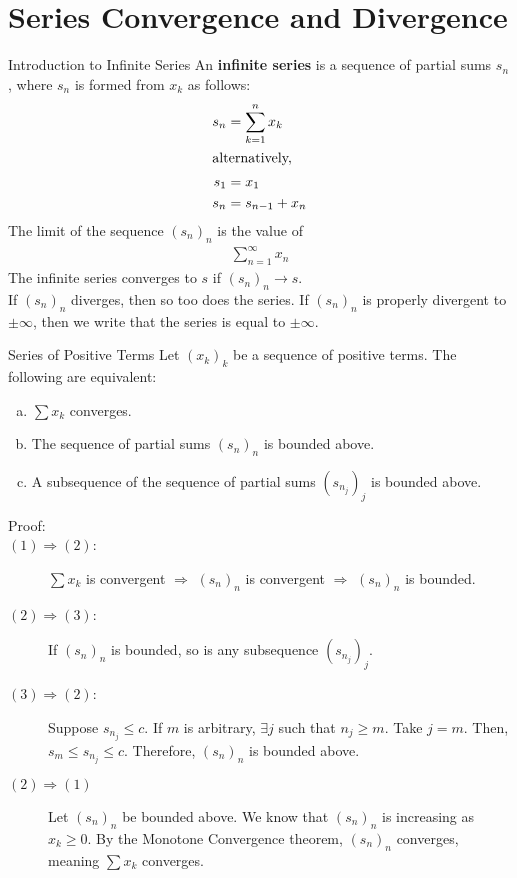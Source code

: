 \documentclass[10pt]{extarticle}
\begin{document}
  \section{Series Convergence and Divergence}%
  \begin{problem}{Introduction to Infinite Series}
    An \textbf{infinite series} is a sequence of partial sums $s_n$, where $s_n$ is formed from $x_k$ as follows:
    \begin{align*}
      s_n &= \sum_{k=1}^{n} x_k\\
      \shortintertext{alternatively,}
      s_1 &= x_1\\
      s_{n} &= s_{n-1} + x_n
    \end{align*}
    The limit of the sequence $(s_n)_n$ is the value of
    \begin{align*}
      \sum_{n=1}^{\infty}x_n
    \end{align*}
    The infinite series converges to $s$ if $(s_n)_n \rightarrow s$.\\

    If $(s_n)_n$ diverges, then so too does the series. If $(s_n)_n$ is properly divergent to $\pm \infty$, then we write that the series is equal to $\pm\infty$.
  \end{problem}
  \begin{problem}{Series of Positive Terms}
    Let $(x_k)_k$ be a sequence of positive terms. The following are equivalent:
    \begin{enumerate}[(a)]
      \item $\sum x_k$ converges.
      \item The sequence of partial sums $(s_n)_n$ is bounded above.
      \item A subsequence of the sequence of partial sums $(s_{n_j})_j$ is bounded above.
    \end{enumerate}
    \begin{description}
      \item[Proof:] \hfill
      \item[$(1) \Rightarrow (2)$:] $\sum x_k$ is convergent $\Rightarrow$ $(s_n)_n$ is convergent $\Rightarrow$ $(s_n)_n$ is bounded.
      \item[$(2) \Rightarrow (3)$:] If $(s_n)_n$ is bounded, so is any subsequence $(s_{n_j})_j$.
      \item[$(3) \Rightarrow (2)$:] Suppose $s_{n_j} \leq c$. If $m$ is arbitrary, $\exists j$ such that $n_j \geq m$. Take $j = m$. Then, $s_{m} \leq s_{n_j} \leq c$. Therefore, $(s_n)_n$ is bounded above.
      \item[$(2) \Rightarrow (1)$] Let $(s_n)_n$ be bounded above. We know that $(s_n)_n$ is increasing as $x_k \geq 0$. By the Monotone Convergence theorem, $(s_n)_n$ converges, meaning $\sum x_k$ converges.
    \end{description}
  \end{problem}
\end{document}
